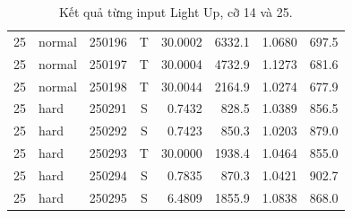 \begin{table}[H]
\begin{tabular*}{\textwidth}{@{\extracolsep{\fill}}rlrcrrrr@{}}
25 & normal & 250196 & T & 30.0002 & 6332.1 & 1.0680 & 697.5\\
25 & normal & 250197 & T & 30.0004 & 4732.9 & 1.1273 & 681.6\\
25 & normal & 250198 & T & 30.0044 & 2164.9 & 1.0274 & 677.9\\
25 & hard & 250291 & S & 0.7432 & 828.5 & 1.0389 & 856.5\\
25 & hard & 250292 & S & 0.7423 & 850.3 & 1.0203 & 879.0\\
25 & hard & 250293 & T & 30.0000 & 1938.4 & 1.0464 & 855.0\\
25 & hard & 250294 & S & 0.7835 & 870.3 & 1.0421 & 902.7\\
25 & hard & 250295 & S & 6.4809 & 1855.9 & 1.0838 & 868.0\\
\bottomrule\end{tabular*}
\caption{Kết quả từng input Light Up, cỡ 14 và 25.}
\end{table}
